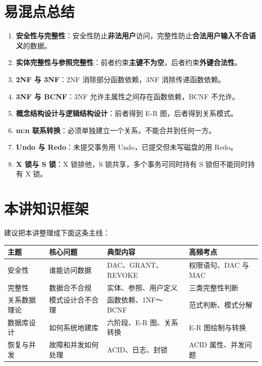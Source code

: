 \documentclass{../../note}
\begin{document}
\section{易混点总结}

\begin{enumerate}
  \item \textbf{安全性与完整性}：安全性防止\textbf{非法用户}访问，完整性防止\textbf{合法用户输入不合语义}的数据。
  \item \textbf{实体完整性与参照完整性}：前者约束\textbf{主键不为空}，后者约束\textbf{外键合法性}。
  \item \textbf{2NF 与 3NF}：2NF 消除部分函数依赖，3NF 消除传递函数依赖。
  \item \textbf{3NF 与 BCNF}：3NF 允许主属性之间存在函数依赖，BCNF 不允许。
  \item \textbf{概念结构设计与逻辑结构设计}：前者得到 E-R 图，后者得到关系模式。
  \item \textbf{m:n 联系转换}：必须单独建立一个关系，不能合并到任何一方。
  \item \textbf{Undo 与 Redo}：未提交事务用 Undo，已提交但未写磁盘的用 Redo。
  \item \textbf{X 锁与 S 锁}：X 锁排他，S 锁共享，多个事务可同时持有 S 锁但不能同时持有 X 锁。
\end{enumerate}

\section{本讲知识框架}

建议把本讲整理成下面这条主线：

\begin{center}
\begin{tabular}{|>{\centering\arraybackslash}m{2.2cm}|>{\centering\arraybackslash}m{2.8cm}|>{\centering\arraybackslash}m{3.2cm}|>{\centering\arraybackslash}m{3.2cm}|}
\hline
主题 & 核心问题 & 典型内容 & 高频考点 \\
\hline
安全性 & 谁能访问数据 & DAC、GRANT、REVOKE & 权限语句、DAC 与 MAC \\
\hline
完整性 & 数据合不合规 & 实体、参照、用户定义 & 三类完整性判断 \\
\hline
关系数据理论 & 模式设计合不合理 & 函数依赖、1NF～BCNF & 范式判断、模式分解 \\
\hline
数据库设计 & 如何系统地建库 & 六阶段、E-R 图、关系转换 & E-R 图绘制与转换 \\
\hline
恢复与并发 & 故障和并发如何处理 & ACID、日志、封锁 & ACID 属性、并发问题 \\
\hline
\end{tabular}
\end{center}
\end{document}
